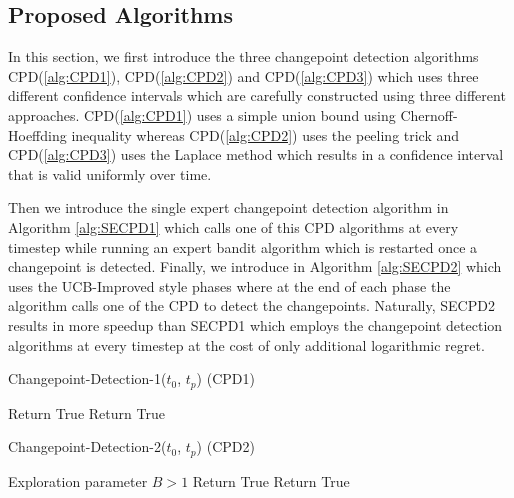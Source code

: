 \subsection{Proposed Algorithms}

In this section, we first introduce the three changepoint detection algorithms CPD(\ref{alg:CPD1}), CPD(\ref{alg:CPD2}) and CPD(\ref{alg:CPD3}) which uses three different confidence intervals which are carefully constructed using three different approaches.  CPD(\ref{alg:CPD1}) uses a simple union bound using Chernoff-Hoeffding inequality whereas CPD(\ref{alg:CPD2}) uses the peeling trick and CPD(\ref{alg:CPD3}) uses the Laplace method which results in a confidence interval that is valid uniformly over time.

Then we introduce the single expert changepoint detection algorithm in Algorithm \ref{alg:SECPD1} which calls one of this CPD algorithms at every timestep while running an expert bandit algorithm which is restarted once a changepoint is detected. Finally, we introduce in Algorithm \ref{alg:SECPD2} which uses the UCB-Improved \citep{auer2010ucb}  style phases where at the end of each phase the algorithm calls one of the CPD to detect the changepoints. Naturally, SECPD2 results in more speedup than SECPD1 which employs the changepoint detection algorithms at every timestep at the cost of only additional logarithmic regret.  

\begin{algorithm}[!ht]
\caption{Changepoint-Detection-1($t_0$, $t_p$) (CPD1)}
\label{alg:CPD1}
\begin{algorithmic}
\State {}
\State Return True
\State Return True
\EndIf
\EndFor
\EndFor
\end{algorithmic}
\end{algorithm}

\begin{algorithm}[!ht]
\caption{Changepoint-Detection-2($t_0$, $t_p$) (CPD2)}
\label{alg:CPD2}
\begin{algorithmic}
 Exploration parameter $B>1$
\State {}
\State Return True
\State Return True
\EndIf
\EndFor
\EndFor
\end{algorithmic}
\end{algorithm}

